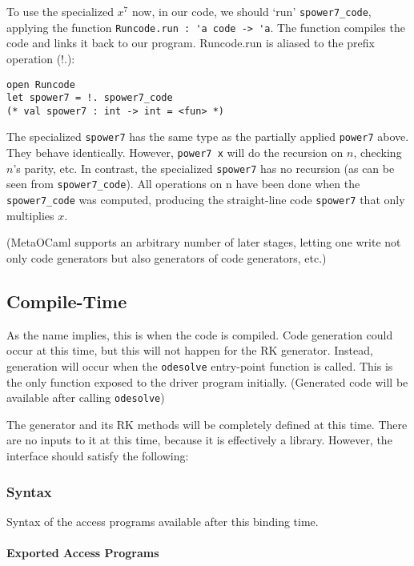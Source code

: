 \documentclass[12pt, titlepage]{article}
\begin{document}
To use the specialized $x^7$ now, in our code, we should `run' 
\lstinline|spower7_code|, applying the function 
\lstinline|Runcode.run : 'a code -> 'a|. The function compiles the code and 
links it back to our program. Runcode.run is aliased to the prefix operation 
(!.):
\begin{lstlisting}
open Runcode
let spower7 = !. spower7_code
(* val spower7 : int -> int = <fun> *)
\end{lstlisting}

The specialized \lstinline|spower7| has the same type as the partially applied 
\lstinline|power7| above. They behave identically. However, 
\lstinline|power7 x| will do the recursion on $n$, checking $n$'s parity, etc. 
In contrast, the specialized \lstinline|spower7| has no recursion (as can be 
seen from \lstinline|spower7_code|). All operations on n have been done when 
the \lstinline|spower7_code| was computed, producing the straight-line code 
\lstinline|spower7| that only multiplies $x$.

(MetaOCaml supports an arbitrary number of later stages, letting one write not 
only code generators but also generators of code generators, etc.)

\subsection{Compile-Time}\label{ssec:compile-time}
As the name implies, this is when the code is compiled. Code generation could 
occur at this time, but this will not happen for the RK generator. Instead, 
generation will occur when the \lstinline[language=ML]|odesolve| entry-point 
function is called. 
This is the only function exposed to the driver program initially. (Generated 
code will be available after calling \lstinline[language=ML]|odesolve|)

The generator and its RK methods will be completely defined at this time. There 
are no inputs to it at this time, because it is effectively a library. However, 
the interface should satisfy the following:

\subsubsection{Syntax}
Syntax of the access programs available after this binding time.

\paragraph{Exported Access Programs}
\end{document}
